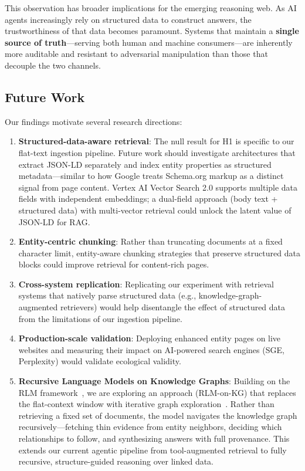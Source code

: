 \documentclass[runningheads]{llncs}
\begin{document}
This observation has broader implications for the emerging reasoning
web.  As AI agents increasingly rely on structured data to construct
answers, the trustworthiness of that data becomes paramount.  Systems
that maintain a \textbf{single source of truth}---serving both human
and machine consumers---are inherently more auditable and resistant to
adversarial manipulation than those that decouple the two channels.

\subsection{Future Work}


Our findings motivate several research directions:

\begin{enumerate}
    \item \textbf{Structured-data-aware retrieval}: The null result for
          H1 is specific to our flat-text ingestion pipeline. Future work
          should investigate architectures that extract JSON-LD separately
          and index entity properties as structured metadata---similar to
          how Google treats Schema.org markup as a distinct signal from
          page content. Vertex AI Vector Search 2.0 supports multiple
          data fields with independent embeddings; a dual-field approach
          (body text + structured data) with multi-vector retrieval
          could unlock the latent value of JSON-LD for RAG.
    \item \textbf{Entity-centric chunking}: Rather than truncating
          documents at a fixed character limit, entity-aware chunking
          strategies that preserve structured data blocks could improve
          retrieval for content-rich pages.
    \item \textbf{Cross-system replication}: Replicating our experiment
          with retrieval systems that natively parse structured data
          (e.g., knowledge-graph-augmented retrievers) would help
          disentangle the effect of structured data from the limitations
          of our ingestion pipeline.
    \item \textbf{Production-scale validation}: Deploying enhanced
          entity pages on live websites and measuring their impact on
          AI-powered search engines (SGE, Perplexity) would validate
          ecological validity.
    \item \textbf{Recursive Language Models on Knowledge Graphs}:
          Building on the RLM framework~\cite{zhang2025rlm}, we are
          exploring an approach (RLM-on-KG) that replaces the flat-context
          window with iterative graph exploration~\cite{volpini2025rlmkg}.
          Rather than retrieving a fixed set of documents, the model
          navigates the knowledge graph recursively---fetching thin
          evidence from entity neighbors, deciding which relationships
          to follow, and synthesizing answers with full provenance.
          This extends our current agentic pipeline from tool-augmented
          retrieval to fully recursive, structure-guided reasoning
          over linked data.
\end{enumerate}
\end{document}
